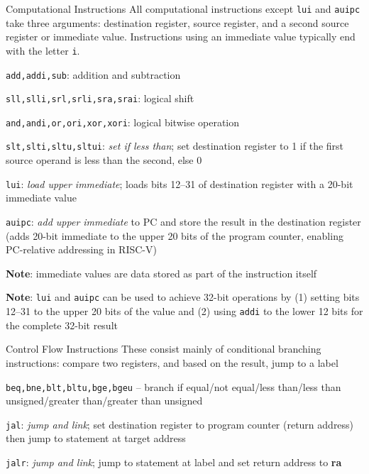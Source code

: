 \documentclass[12pt]{report}
\begin{document}
\begin{genbox}{Computational Instructions}
	All computational instructions except \verb|lui| and \verb|auipc| take three arguments: destination register, source register, and a second source register or immediate value. Instructions using an immediate value typically end with the letter \verb|i|.
	\begin{dfnitems}
		\item \verb|add,addi,sub|: addition and subtraction
		\item \verb|sll,slli,srl,srli,sra,srai|: logical shift
		\item \verb|and,andi,or,ori,xor,xori|: logical bitwise operation
		\item \verb|slt,slti,sltu,sltui|: \textit{set if less than}; set destination register to 1 if the first source operand is less than the second, else 0
		\item \verb|lui|: \textit{load upper immediate}; loads bits 12--31 of destination register with a 20-bit immediate value
		\item \verb|auipc|: \textit{add upper immediate} to PC and store the result in the destination register (adds 20-bit immediate to the upper 20 bits of the program counter, enabling PC-relative addressing in RISC-V)
	\end{dfnitems}
	\tcblower
	\textbf{Note}: immediate values are data stored as part of the instruction itself
	
	\textbf{Note}: \verb|lui| and \verb|auipc| can be used to achieve 32-bit operations by (1) setting bits 12--31 to the upper 20 bits of the value and (2) using \verb|addi| to the lower 12 bits for the complete 32-bit result
\end{genbox}

\begin{genbox}{Control Flow Instructions}
	These consist mainly of conditional branching instructions: compare two registers, and based on the result, jump to a label
	\begin{dfnitems}
		\item \verb|beq,bne,blt,bltu,bge,bgeu| -- branch if equal/not equal/less than/less than unsigned/greater than/greater than unsigned
		\item \verb|jal|: \textit{jump and link}; set destination register to program counter (return address) then jump to statement at target address
		\item \verb|jalr|: \textit{jump and link}; jump to statement at label and set return address to \textbf{ra}
	\end{dfnitems}
\end{genbox}
\end{document}
